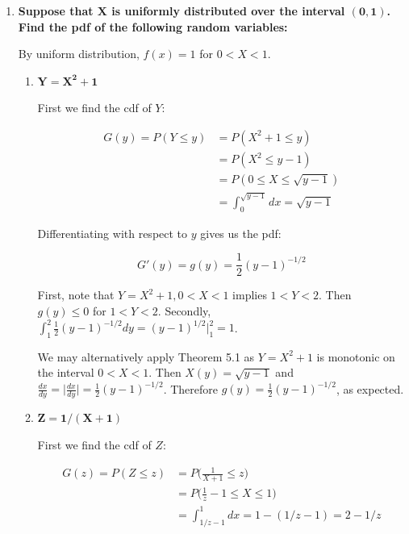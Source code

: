 \documentclass[10pt, oneside]{article}
\begin{document}
\begin{enumerate}[label=5.\arabic*]
\item  \begin{tcolorbox}[
  colback=Cerulean!5!white,
  colframe=Cerulean!75!black]
\textbf{Suppose that $\bm{X}$ is uniformly distributed over the interval $\bm{(0,1)}$. Find the pdf of the following random variables:}
\end{tcolorbox}

By uniform distribution, $f(x) = 1$ for $0 < X < 1$.

	\begin{enumerate}
	\item  \begin{tcolorbox}[
	  colback=Cerulean!5!white,
	  colframe=Cerulean!75!black]
	\textbf{$\bm{Y = X^2 + 1}$}
	\end{tcolorbox}
	
	First we find the cdf of $Y$:
	
	\begin{align*}
	G(y) = P(Y \leq y) &= P(X^2 + 1 \leq y) \\
	&= P(X^2 \leq y - 1) \\
	&= P(0 \leq X \leq \sqrt{y-1}) \\
	&= \int^{\sqrt{y-1}}_0 dx = \sqrt{y-1}
	\end{align*}
	
	Differentiating with respect to $y$ gives us the pdf:
	
	\[ G'(y) = g(y) = \boxed{ \frac{1}{2} (y - 1)^{-1/2} } \]
	
	First, note that $Y = X^2 + 1, 0 < X < 1$ implies $1 < Y < 2$. Then $g(y) \leq 0$ for $1 < Y < 2$. Secondly, $\int^2_1 \frac{1}{2} (y-1)^{-1/2} dy = (y-1)^{1/2} \big|^2_1 = \boxed{1}$.
	
	We may alternatively apply Theorem 5.1 as $Y = X^2 + 1$ is monotonic on the interval $0 < X < 1$. Then $X(y) = \sqrt{y - 1}$ and $\frac{dx}{dy} = \big| \frac{dx}{dy} \big| = \frac{1}{2} (y-1)^{-1/2}$. Therefore $g(y) = \frac{1}{2} (y-1)^{-1/2}$, as expected.
	
	\item  \begin{tcolorbox}[
	  colback=Cerulean!5!white,
	  colframe=Cerulean!75!black]
	\textbf{$\bm{Z = 1 / (X + 1)}$}
	\end{tcolorbox}
	
	First we find the cdf of $Z$:
	
	\begin{align*}
	G(z) = P(Z \leq z) &= P \Big( \frac{1}{X + 1} \leq z \Big) \\
	&= P \Big( \frac{1}{z} - 1 \leq X \leq 1 \Big) \\
	&= \int^1_{1/z - 1} dx = 1 - (1/z - 1) = 2 - 1/z
	\end{align*}
	

\end{enumerate}
\end{enumerate}
\end{document}
